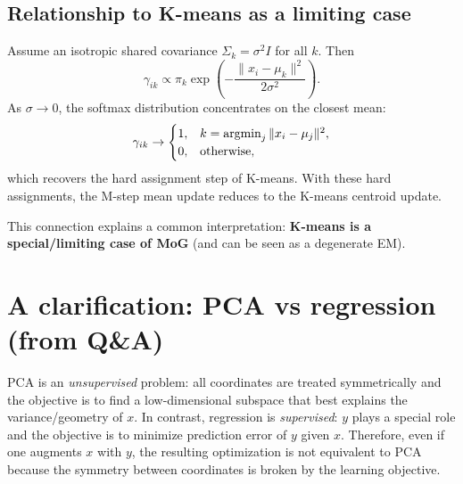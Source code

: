 \documentclass[../main]{subfiles}
\begin{document}
\subsection{Relationship to K-means as a limiting case}
Assume an isotropic shared covariance $\Sigma_k=\sigma^2 I$ for all $k$.
Then
\begin{equation}
    \gamma_{ik}
    \propto
    \pi_k \exp\left(-\frac{\|x_i-\mu_k\|^2}{2\sigma^2}\right).
\end{equation}
As $\sigma\to 0$, the softmax distribution concentrates on the closest mean:
\begin{equation}
    \gamma_{ik}
    \to
    \begin{cases}
        1, & k=\mathop{\mathrm{argmin}}_j \|x_i-\mu_j\|^2,\\
        0, & \text{otherwise},
    \end{cases}
\end{equation}
which recovers the hard assignment step of K-means. With these hard assignments,
the M-step mean update reduces to the K-means centroid update.

\begin{remark}
    This connection explains a common interpretation: \textbf{K-means is a
    special/limiting case of MoG} (and can be seen as a degenerate EM).
\end{remark}

\section{A clarification: PCA vs regression (from Q\&A)}
\begin{note}
    PCA is an \emph{unsupervised} problem: all coordinates are treated
    symmetrically and the objective is to find a low-dimensional subspace that
    best explains the variance/geometry of $x$.
    In contrast, regression is \emph{supervised}: $y$ plays a special role and
    the objective is to minimize prediction error of $y$ given $x$.
    Therefore, even if one augments $x$ with $y$, the resulting optimization is
    not equivalent to PCA because the symmetry between coordinates is broken by
    the learning objective.
\end{note}
\end{document}
